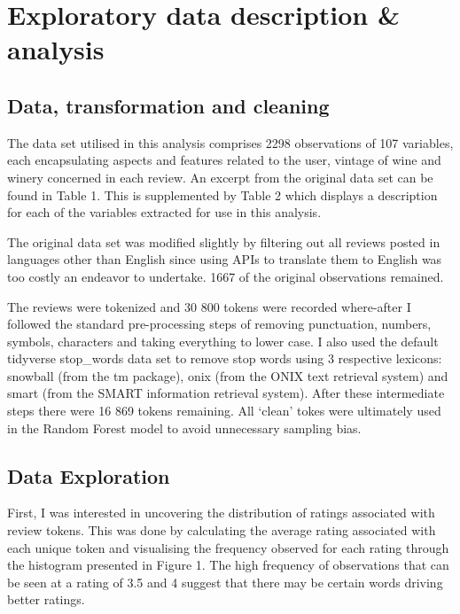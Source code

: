 \documentclass[11pt,preprint]{elsarticle}
\numberwithin{equation}{section}
\numberwithin{figure}{section}
\numberwithin{table}{section}
\begin{document}
\newpage

\section{Exploratory data description \&
analysis}\label{exploratory-data-description-analysis}

\label{Data}

\subsection{Data, transformation and
cleaning}\label{data-transformation-and-cleaning}

The data set utilised in this analysis comprises 2298 observations of
107 variables, each encapsulating aspects and features related to the
user, vintage of wine and winery concerned in each review. An excerpt
from the original data set can be found in Table 1. This is supplemented
by Table 2 which displays a description for each of the variables
extracted for use in this analysis.

The original data set was modified slightly by filtering out all reviews
posted in languages other than English since using APIs to translate
them to English was too costly an endeavor to undertake. 1667 of the
original observations remained.

The reviews were tokenized and 30 800 tokens were recorded where-after I
followed the standard pre-processing steps of removing punctuation,
numbers, symbols, characters and taking everything to lower case. I also
used the default tidyverse stop\_words data set to remove stop words
using 3 respective lexicons: snowball (from the tm package), onix (from
the ONIX text retrieval system) and smart (from the SMART information
retrieval system). After these intermediate steps there were 16 869
tokens remaining. All `clean' tokes were ultimately used in the Random
Forest model to avoid unnecessary sampling bias.

\subsection{Data Exploration}\label{data-exploration}

First, I was interested in uncovering the distribution of ratings
associated with review tokens. This was done by calculating the average
rating associated with each unique token and visualising the frequency
observed for each rating through the histogram presented in Figure 1.
The high frequency of observations that can be seen at a rating of 3.5
and 4 suggest that there may be certain words driving better ratings.
\end{document}
